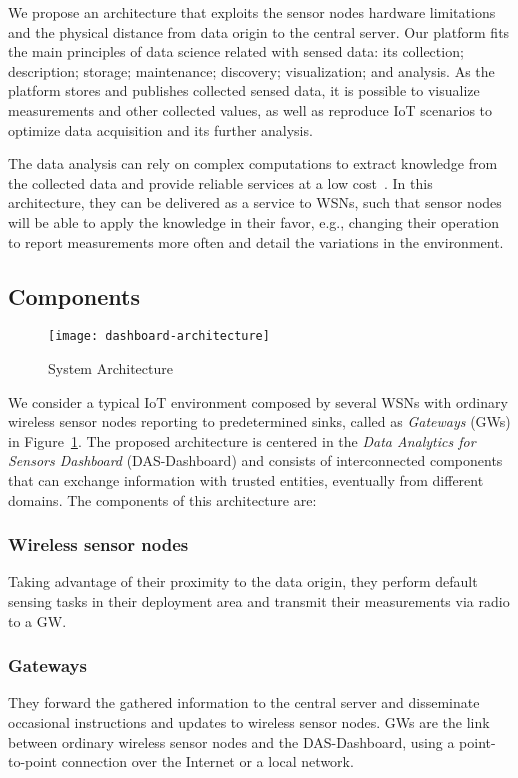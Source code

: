 \documentclass[conference, letterpaper]{IEEEtran}
\newcommand{\dashboard}[1]{DAS-Dashboard}
\newcommand{\gateway}[1]{GW#1}
\begin{document}
We propose an architecture that exploits the sensor nodes hardware limitations and the physical distance from data origin to the central server. Our platform fits the main principles of data science related with sensed data: its collection; description; storage; maintenance; discovery; visualization; and analysis. As the platform stores and publishes collected sensed data, it is possible to visualize measurements and other collected values, as well as reproduce IoT scenarios to optimize data acquisition and its further analysis.

The data analysis can rely on complex computations to extract knowledge from the collected data and provide reliable services at a low cost~\cite{7123563}. In this architecture, they can be delivered as a service to WSNs, such that sensor nodes will be able to apply the knowledge in their favor, e.g., changing their operation to report measurements more often and detail the variations in the environment.

\subsection{Components}

\begin{figure}[t]
        \centering
	\texttt{[image: dashboard-architecture]}
        \caption{System Architecture}
        \label{fig:system-architecture}
\end{figure}

We consider a typical IoT environment composed by several WSNs with ordinary wireless sensor nodes reporting to predetermined sinks, called as \emph{Gateways} (\gateway{s}) in Figure~\ref{fig:system-architecture}. The proposed architecture is centered in the \emph{Data Analytics for Sensors 
Dashboard} (\dashboard{}) and consists of interconnected components that can exchange information with trusted entities, eventually from different domains. The components of this architecture are:

\subsubsection{Wireless sensor nodes}
Taking advantage of their proximity to the data origin, they perform default sensing tasks in their deployment area and transmit their measurements via radio to a \gateway{}.

\subsubsection{Gateways}
They forward the gathered information to the central server and disseminate occasional instructions and updates to wireless sensor nodes. \gateway{s} are the link between ordinary wireless sensor nodes and the \dashboard{}, using a point-to-point connection over the Internet or a local network.
\end{document}
